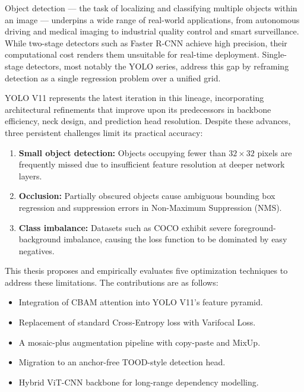 \documentclass[12pt, a4paper]{report}
\begin{document}
Object detection — the task of localizing and classifying multiple objects within an 
image — underpins a wide range of real-world applications, from autonomous driving and 
medical imaging to industrial quality control and smart surveillance. While two-stage 
detectors such as Faster R-CNN \cite{ren2015fasterrcnn} achieve high precision, their 
computational cost renders them unsuitable for real-time deployment. Single-stage 
detectors, most notably the YOLO series, address this gap by reframing detection as a 
single regression problem over a unified grid.

YOLO V11 represents the latest iteration in this lineage, incorporating architectural 
refinements that improve upon its predecessors in backbone efficiency, neck design, and 
prediction head resolution. Despite these advances, three persistent challenges limit 
its practical accuracy:

\begin{enumerate}
  \item \textbf{Small object detection:} Objects occupying fewer than $32 \times 32$ 
    pixels are frequently missed due to insufficient feature resolution at deeper 
    network layers.
  \item \textbf{Occlusion:} Partially obscured objects cause ambiguous bounding box 
    regression and suppression errors in Non-Maximum Suppression (NMS).
  \item \textbf{Class imbalance:} Datasets such as COCO exhibit severe foreground-
    background imbalance, causing the loss function to be dominated by easy negatives.
\end{enumerate}

This thesis proposes and empirically evaluates five optimization techniques to address 
these limitations. The contributions are as follows:

\begin{itemize}
  \item Integration of CBAM attention into YOLO V11's feature pyramid.
  \item Replacement of standard Cross-Entropy loss with Varifocal Loss.
  \item A mosaic-plus augmentation pipeline with copy-paste and MixUp.
  \item Migration to an anchor-free TOOD-style detection head.
  \item Hybrid ViT-CNN backbone for long-range dependency modelling.
\end{itemize}
\end{document}
